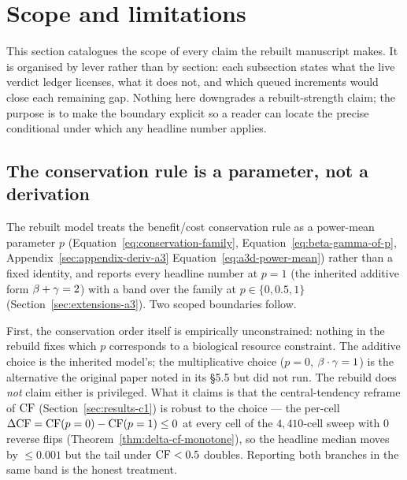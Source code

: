 %
%

\section{Scope and limitations}
\label{sec:limitations}

This section catalogues the scope of every claim the rebuilt
manuscript makes.  It is organised by lever rather than by section:
each subsection states what the live verdict ledger licenses, what
it does not, and which queued increments would close each remaining
gap.  Nothing here downgrades a rebuilt-strength claim; the purpose
is to make the boundary explicit so a reader can locate the precise
conditional under which any headline number applies.

\subsection{The conservation rule is a parameter, not a derivation}
\label{sec:limitations-a3}

The rebuilt model treats the benefit/cost conservation rule as a
power-mean parameter $p$
(Equation~\eqref{eq:conservation-family}, Equation~\eqref{eq:beta-gamma-of-p},
Appendix~\ref{sec:appendix-deriv-a3} Equation~\eqref{eq:a3d-power-mean})
rather than a fixed identity, and reports every headline number at
$p = 1$ (the inherited additive form $\beta + \gamma = 2$) with a
band over the family at $p \in \{0, 0.5, 1\}$
(Section~\ref{sec:extensions-a3}).  Two scoped boundaries follow.

First, the conservation order itself is empirically unconstrained:
nothing in the rebuild fixes which $p$ corresponds to a biological
resource constraint.  The additive choice is the inherited model's;
the multiplicative choice ($p = 0$, $\beta \cdot \gamma = 1$) is
the alternative the original paper noted in its §5.5 but did not
run.  The rebuild does \emph{not} claim either is privileged.  What
it claims is that the central-tendency reframe of $\mathrm{CF}$
(Section~\ref{sec:results-c1}) is robust to the choice — the
per-cell $\Delta \mathrm{CF} = \mathrm{CF}(p = 0) - \mathrm{CF}(p = 1) \le 0$ at every cell
of the $4{,}410$-cell sweep with $0$ reverse flips
(Theorem~\ref{thm:delta-cf-monotone}), so the headline median moves
by $\le 0.001$ but the tail under $\mathrm{CF} < 0.5$ doubles.  Reporting
both branches in the same band is the honest treatment.

